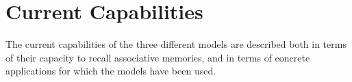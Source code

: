 \section{Current Capabilities}

The current capabilities of the three different models are described both in terms of their capacity to recall associative memories, and in terms of concrete applications for which the models have been used. %





